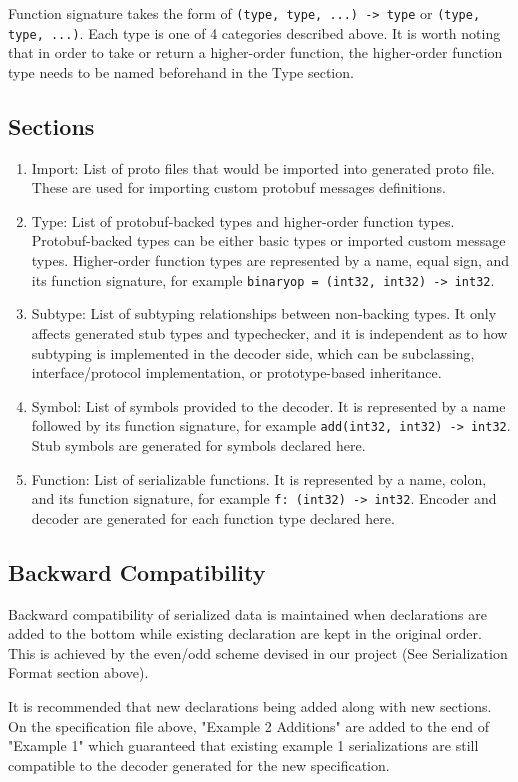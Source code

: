 \documentclass[12pt]{article}
\begin{document}
Function signature takes the form of \texttt{(type, type, ...) -> type} or \texttt{(type, type, ...)}. Each type is one of 4 categories described above. It is worth noting that in order to take or return a higher-order function, the higher-order function type needs to be named beforehand in the Type section.

\subsection{Sections}
\begin{enumerate}
\item Import: List of proto files that would be imported into generated proto file. These are used for importing custom protobuf messages definitions.
\item Type: List of protobuf-backed types and higher-order function types. Protobuf-backed types can be either basic types or imported custom message types. Higher-order function types are represented by a name, equal sign, and its function signature, for example \texttt{binaryop = (int32, int32) -> int32}.
\item Subtype: List of subtyping relationships between non-backing types. It only affects generated stub types and typechecker, and it is independent as to how subtyping is implemented in the decoder side, which can be subclassing, interface/protocol implementation, or prototype-based inheritance.
\item Symbol: List of symbols provided to the decoder. It is represented by a name followed by its function signature, for example \texttt{add(int32, int32) -> int32}. Stub symbols are generated for symbols declared here.
\item Function: List of serializable functions. It is represented by a name, colon, and its function signature, for example \texttt{f: (int32) -> int32}. Encoder and decoder are generated for each function type declared here.
\end{enumerate}

\subsection{Backward Compatibility}
Backward compatibility of serialized data is maintained when declarations are added to the bottom while existing declaration are kept in the original order. This is achieved by the even/odd scheme devised in our project (See Serialization Format section above).

It is recommended that new declarations being added along with new sections. On the specification file above, "Example 2 Additions" are added to the end of "Example 1" which guaranteed that existing example 1 serializations are still compatible to the decoder generated for the new specification.
\end{document}
